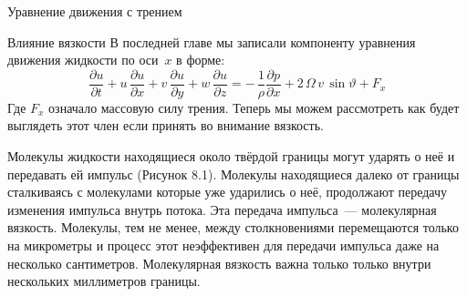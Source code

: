 \begin{chapter}{Уравнение движения с трением}
\begin{section}{Влияние вязкости}
В последней главе мы записали компоненту уравнения движения жидкости
по оси~$x$ в форме:
\begin{equation}
\frac{\partial{u}}{\partial{t}}+u\,\frac{\partial{u}}{\partial{x}}+v\,
\frac{\partial{u}}{\partial{y}}+w\,\frac{\partial{u}}{\partial{z}}=-\,
\frac{1}{\rho}\frac{\partial{p}}{\partial{x}} + 2\,\Omega\,v\,\sin\vartheta + F_x
\end{equation}
Где $F_x$ означало массовую силу трения. Теперь мы можем рассмотреть как
будет выглядеть этот член если принять во внимание вязкость.
%

Молекулы жидкости находящиеся около твёрдой границы могут ударять о
неё и передавать ей импульс (Рисунок 8.1). Молекулы находящиеся далеко
от границы сталкиваясь с молекулами которые уже ударились о неё,
продолжают передачу изменения импульса внутрь потока. Эта передача
импульса~--- молекулярная вязкость. Молекулы, тем не менее, между
столкновениями перемещаются только на микрометры и процесс этот
неэффективен для передачи импульса даже на несколько
сантиметров. Молекулярная вязкость важна только только внутри
нескольких миллиметров границы.
%


\end{section}
\end{chapter}
